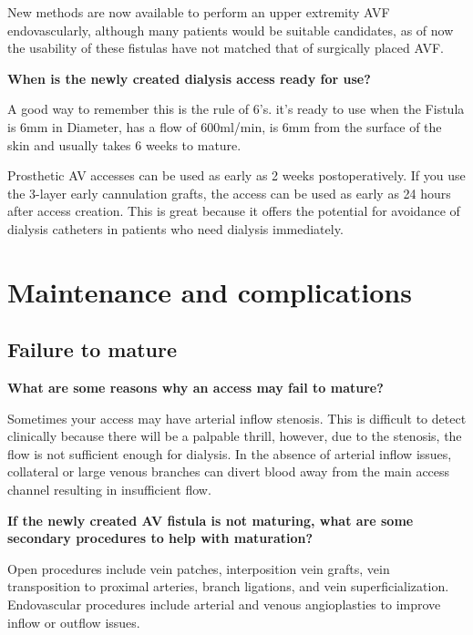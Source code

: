 \documentclass[
]{book}
\begin{document}
New methods are now available to perform an upper extremity AVF
endovascularly, although many patients would be suitable candidates, as
of now the usability of these fistulas have not matched that of
surgically placed AVF.\citep{lok2017}

\textbf{When is the newly created dialysis access ready for use?}

A good way to remember this is the rule of 6's. it's ready to use when
the Fistula is 6mm in Diameter, has a flow of 600ml/min, is 6mm from the
surface of the skin and usually takes 6 weeks to mature.

Prosthetic AV accesses can be used as early as 2 weeks postoperatively.
If you use the 3-layer early cannulation grafts, the access can be used
as early as 24 hours after access creation. This is great because it
offers the potential for avoidance of dialysis catheters in patients who
need dialysis immediately.\citep{glickman2015}

\hypertarget{maintenance-and-complications}{%
\section{Maintenance and complications}\label{maintenance-and-complications}}

\hypertarget{failure-to-mature}{%
\subsection{Failure to mature}\label{failure-to-mature}}

\textbf{What are some reasons why an access may fail to mature?}

Sometimes your access may have arterial inflow stenosis. This is
difficult to detect clinically because there will be a palpable thrill,
however, due to the stenosis, the flow is not sufficient enough for
dialysis. In the absence of arterial inflow issues, collateral or large
venous branches can divert blood away from the main access channel
resulting in insufficient flow.

\textbf{If the newly created AV fistula is not maturing, what are some
secondary procedures to help with maturation?}

Open procedures include vein patches, interposition vein grafts, vein
transposition to proximal arteries, branch ligations, and vein
superficialization. Endovascular procedures include arterial and venous
angioplasties to improve inflow or outflow issues.\citep{sidawy2008}
\end{document}
